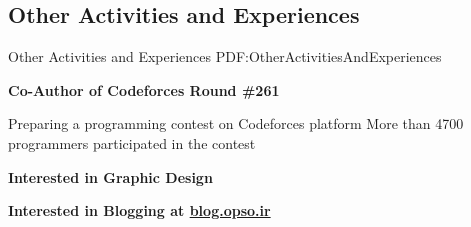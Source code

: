 \documentclass[a4paper,10pt,oneside]{article}
\begin{document}
\begin{body}
\section
{Other Activities\newline
and Experiences}
{Other Activities\newline
and Experiences}
{PDF:OtherActivitiesAndExperiences}

{\textbf{Co-Author of Codeforces Round \#261}}
\hfill
{}
\par
Preparing a programming contest on Codeforces platform More than 4700 programmers participated in the contest
\begin{detail}
\end{detail}


\EntryGap
{\textbf{Interested in Graphic Design}}
\hfill
\par
\begin{detail}
\end{detail}

\EntryGap
{\textbf{Interested in Blogging at \href{http://blog.opso.ir}{blog.opso.ir}}}
\hfill
\par
\begin{detail}
\end{detail}


\end{body}



\label{LastPage}~
\end{document}
